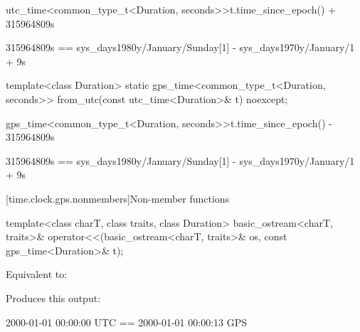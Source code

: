 \begin{itemdescr}
\pnum
\returns
\begin{codeblock}
utc_time<common_type_t<Duration, seconds>>{t.time_since_epoch()} + 315964809s
\end{codeblock}
\begin{note}
\begin{codeblock}
315964809s == sys_days{1980y/January/Sunday[1]} - sys_days{1970y/January/1} + 9s
\end{codeblock}
\end{note}
\end{itemdescr}

%
\begin{itemdecl}
template<class Duration>
  static gps_time<common_type_t<Duration, seconds>>
    from_utc(const utc_time<Duration>& t) noexcept;
\end{itemdecl}

\begin{itemdescr}
\pnum
\returns
\begin{codeblock}
gps_time<common_type_t<Duration, seconds>>{t.time_since_epoch()} - 315964809s
\end{codeblock}
\begin{note}
\begin{codeblock}
315964809s == sys_days{1980y/January/Sunday[1]} - sys_days{1970y/January/1} + 9s
\end{codeblock}
\end{note}
\end{itemdescr}

[time.clock.gps.nonmembers]{Non-member functions}

%
\begin{itemdecl}
template<class charT, class traits, class Duration>
  basic_ostream<charT, traits>&
    operator<<(basic_ostream<charT, traits>& os, const gps_time<Duration>& t);
\end{itemdecl}

\begin{itemdescr}
\pnum
\effects
Equivalent to:

\pnum
\begin{example}

Produces this output:

\begin{outputblock}
2000-01-01 00:00:00 UTC == 2000-01-01 00:00:13 GPS
\end{outputblock}
\end{example}
\end{itemdescr}

